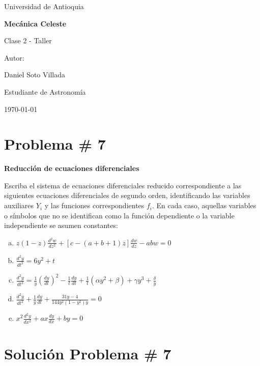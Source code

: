 \documentclass[a4paper]{article}
\begin{document}
\begin{titlepage}
  \centering
  {\Large Universidad de Antioquia\par}
  \vspace{2cm}
  {\huge\bfseries Mecánica Celeste\par}
  \vspace{0.4cm}
  {\Large Clase 2 - Taller\par}
  \vspace{2.5cm}
  {\large Autor:\par}
  \vspace{0.2cm}
  {\large Daniel Soto Villada\par}
  {\large Estudiante de Astronomía\par}
  \vfill
  {\large \today\par}
\end{titlepage}

\newpage
\tableofcontents
\newpage

\section{Problema \# 7}

\textbf{Reducción de ecuaciones diferenciales}

Escriba el sistema de ecuaciones diferenciales reducido correspondiente a las siguientes ecuaciones diferenciales de segundo orden, identificando las variables auxiliares $Y_i$ y las funciones correspondientes $f_i$. En cada caso, aquellas variables o símbolos que no se identifican como la función dependiente o la variable independiente se asumen constantes:

\begin{enumerate}[a)]
    \item $z(1-z) \frac{d^2w}{dz^2} + [c - (a+b+1)z] \frac{dw}{dz} - abw = 0$
    \item $\frac{d^2y}{dt^2} = 6y^2 + t$
    \item $\frac{d^2y}{dt^2} = \frac{1}{y} \left( \frac{dy}{dt} \right)^2 - \frac{1}{t} \frac{dy}{dt} + \frac{1}{t} (\alpha y^2 + \beta) + \gamma y^3 + \frac{\delta}{y}$
    \item $\frac{d^2y}{dt^2} + \frac{1}{y} \frac{dy}{dt} + \frac{31y - 4}{144y^2(1-y^2)y} = 0$
    \item $x^2 \frac{d^2y}{dx^2} + ax \frac{dy}{dx} + by = 0$
\end{enumerate}

\section*{Solución Problema \# 7}
\end{document}
